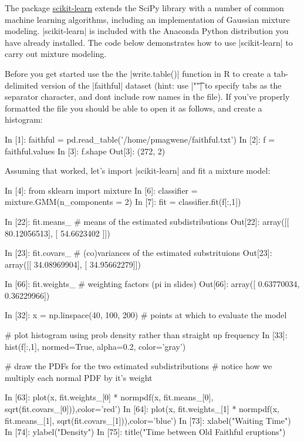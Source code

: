 The package \href{http://scikit-learn.org/stable/}{scikit-learn} extends the SciPy library with a number of common machine learning algorithms, including an implementation of Gaussian mixture modeling.  |scikit-learn| is included with the Anaconda Python distribution you have already installed. The code below demonstrates how to use |scikit-learn| to carry out mixture modeling.

Before you get started use the the |write.table()| function in R to create a tab-delimited version of the |faithful| dataset (hint: use |"\t"| to specify tabs as the separator character, and dont include row names in the file). If you've properly formatted the file you should be able to open it as follows, and create a histogram:
%
\begin{python}
In [1]: faithful = pd.read_table('/home/pmagwene/faithful.txt')
In [2]: f = faithful.values
In [3]: f.shape
Out[3]: (272, 2)
\end{python}
%
Assuming that worked, let's import |scikit-learn| and fit a mixture model:
%
\begin{python}
In [4]: from sklearn import mixture
In [6]: classifier = mixture.GMM(n_components = 2)
In [7]: fit = classifier.fit(f[:,1])

In [22]: fit.means_  # means of the estimated subdistributions
Out[22]:
array([[ 80.12056513],
       [ 54.6623402 ]])

In [23]: fit.covars_  # (co)variances of the estimated substrituions
Out[23]:
array([[ 34.08969904],
       [ 34.95662279]])

In [66]: fit.weights_   #  weighting factors (pi in slides)
Out[66]: array([ 0.63770034,  0.36229966])

In [32]: x = np.linspace(40, 100, 200) # points at which to evaluate the model

# plot histogram using prob density rather than straight up frequency
In [33]: hist(f[:,1], normed=True, alpha=0.2, color='gray')

# draw the PDFs for the two estimated subdistributions
# notice how we multiply each normal PDF by it's weight

In [63]: plot(x, fit.weights_[0] * normpdf(x, fit.means_[0], sqrt(fit.covars_[0])),color='red')
In [64]: plot(x, fit.weights_[1] * normpdf(x, fit.means_[1], sqrt(fit.covars_[1])),color='blue')
In [73]: xlabel("Waiting Time")
In [74]: ylabel("Density")
In [75]: title("Time between Old Faithful eruptions")
\end{python}

